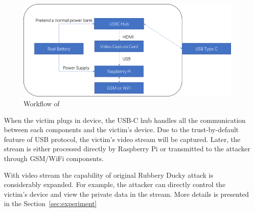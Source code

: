 \begin{figure}[htbp]
\includegraphics[width=\linewidth]{./Figs/workflow.png}
\caption{Workflow of \tool}
\label{fig:workflow}
\end{figure}

When the victim plugs in \tool device, the USB-C hub handles all the communication between each components and the victim's device. Due to the trust-by-default feature of USB protocol, the victim's video stream will be captured. Later, the stream is either processed directly by Raspberry Pi or transmitted to the attacker through GSM/WiFi components.

With video stream the capability of original Rubbery Ducky attack is considerably expanded. For example, the attacker can directly control the victim's device and view the private data in the stream. More details is presented in the Section~\ref{sec:experiment}
